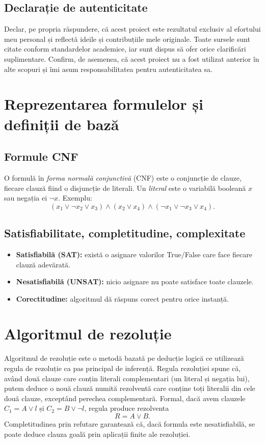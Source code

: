 \documentclass[12pt]{article}
\begin{document}
\subsection{Declarație de autenticitate}
Declar, pe propria răspundere, că acest proiect este rezultatul exclusiv al efortului meu personal și reflectă ideile și contribuțiile mele originale. Toate sursele sunt citate conform standardelor academice, iar sunt dispus să ofer orice clarificări suplimentare. Confirm, de asemenea, că acest proiect nu a fost utilizat anterior în alte scopuri și îmi asum responsabilitatea pentru autenticitatea sa.
\section{Reprezentarea formulelor și definiții de bază}
\subsection{Formule CNF}
O formulă în \emph{forma normală conjunctivă} (CNF) este o conjuncție de clauze, fiecare clauză fiind o disjuncție de literali. Un \emph{literal} este o variabilă booleană $x$ sau negația ei $\neg x$. Exemplu:
\[
  (x_1\lor\neg x_2\lor x_3)\land(x_2 \lor x_4)\land(\neg x_1\lor\neg x_3\lor{x_4}).
\]

\subsection{Satisfiabilitate, completitudine, complexitate}
\begin{itemize}
  \item \textbf{Satisfiabilă (SAT):} există o asignare valorilor True/False care face fiecare clauză adevărată.
  \item \textbf{Nesatisfiabilă (UNSAT):} nicio asignare nu poate satisface toate clauzele.
  \item \textbf{Corectitudine:} algoritmul dă răspuns corect pentru orice instanță.
\end{itemize}

\section{Algoritmul de rezoluție}
Algoritmul de rezoluție este o metodă bazată pe deducție logică ce utilizează regula de rezoluție ca pas principal de inferență. Regula rezoluției spune că, având două clauze care conțin literali complementari (un literal și negația lui), putem deduce o nouă clauză numită rezolventă care conține toți literalii din cele două clauze, exceptând perechea complementară.\cite{handbook} Formal, dacă avem clauzele $C_1 = A \lor l$ și $C_2 = B \lor \neg l$, regula produce rezolventa
\[
  R = A \lor B.
\]
Completitudinea prin refutare garantează că, dacă formula este nesatisfiabilă, se poate deduce clauza goală prin aplicații finite ale rezoluției.
\newpage
\end{document}
